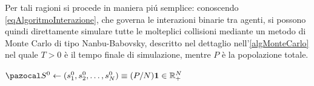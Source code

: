         Per tali ragioni si procede in maniera piú semplice: conoscendo \ref{eqAlgoritmoInterazione}, che governa le interazioni binarie tra agenti, si possono quindi direttamente simulare tutte le molteplici collisioni mediante un metodo di Monte Carlo di tipo Nanbu-Babovsky, descritto nel dettaglio nell'\cref{algMonteCarlo} nel quale \(T>0\) è il tempo finale di simulazione, mentre \(P\) è la popolazione totale.
        
        \begin{algorithm}[htb]
            \caption{Algoritmo \ref{eqAlgoritmoInterazioneUrbano} di tipo Nanbu-Babovsky}
            \label{algMonteCarlo}
            \(\pazocal S^0\gets(s_1^0,s_2^0,\dots,s_N^0)\equiv(P/N)\mathbf 1\in\RPlus^N\)\;\label{algMonteCarloDistribuzioneIniziale}
        \end{algorithm}

